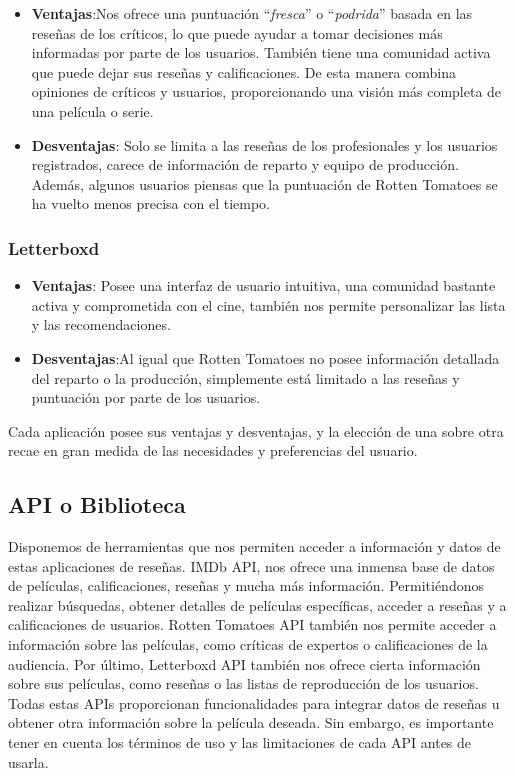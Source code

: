 \begin{itemize}
    \item \textbf{Ventajas}:Nos ofrece una puntuación ``\textit{fresca}'' o ``\textit{podrida}'' basada 
    en las reseñas de los críticos, lo que puede ayudar a tomar decisiones más informadas por parte de 
    los usuarios. También tiene una comunidad activa que puede dejar sus reseñas y calificaciones. De 
    esta manera combina opiniones de críticos y usuarios, proporcionando una visión más completa de una 
    película o serie.
    \item \textbf{Desventajas}: Solo se limita a las reseñas de los profesionales y los usuarios 
    registrados, carece de información de reparto y equipo de producción. Además, algunos usuarios 
    piensas que la puntuación de Rotten Tomatoes se ha vuelto menos precisa con el tiempo.
\end{itemize}

\subsubsection{Letterboxd}

\begin{itemize}
    \item \textbf{Ventajas}: Posee una interfaz de usuario intuitiva, una comunidad bastante activa y 
    comprometida con el cine, también nos permite personalizar las lista y las recomendaciones.
    \item \textbf{Desventajas}:Al igual que Rotten Tomatoes no posee información detallada del reparto 
    o la producción, simplemente está limitado a las reseñas y puntuación por parte de los usuarios.
\end{itemize}

Cada aplicación posee sus ventajas y desventajas, y la elección de una sobre otra recae en gran medida 
de las necesidades y preferencias del usuario.

\subsection{API o Biblioteca}

Disponemos de herramientas que nos permiten acceder a información y datos de estas aplicaciones de reseñas. IMDb API, nos ofrece una inmensa base de datos de películas, calificaciones, reseñas y mucha más información. Permitiéndonos realizar búsquedas, obtener detalles de películas específicas, acceder a reseñas y a calificaciones de usuarios. Rotten Tomatoes API también nos permite acceder a información sobre las películas, como críticas de expertos o calificaciones de la audiencia. Por último, Letterboxd API también nos ofrece cierta información sobre sus películas, como reseñas o las listas de reproducción de los usuarios. Todas estas APIs proporcionan funcionalidades para integrar datos de reseñas u obtener otra información sobre la película deseada. Sin embargo, es importante tener en cuenta los términos de uso y las limitaciones de cada API antes de usarla.

